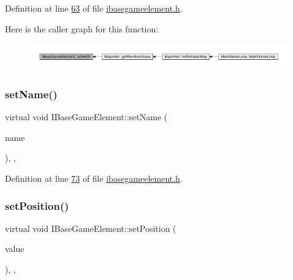 Definition at line \hyperlink{a00047_source_l00063}{63} of file \hyperlink{a00047_source}{ibasegameelement.\+h}.

Here is the caller graph for this function\+:
\nopagebreak
\begin{figure}[H]
\begin{center}
\leavevmode
\includegraphics[width=350pt]{d2/df5/a00137_a2f95e7a61b5db7f2fbbfd32ff786f58c_icgraph}
\end{center}
\end{figure}
\mbox{\label{a00137_a874f246d3249a989750e3db85ea4bfcd}} 
\subsubsection{\texorpdfstring{set\+Name()}{setName()}}
{\footnotesize\ttfamily virtual void I\+Base\+Game\+Element\+::set\+Name (\begin{DoxyParamCaption}\item[{Q\+String}]{name }\end{DoxyParamCaption})\hspace{0.3cm}{\ttfamily [inline]}, {\ttfamily [virtual]}, {\ttfamily [inherited]}}



Definition at line \hyperlink{a00047_source_l00073}{73} of file \hyperlink{a00047_source}{ibasegameelement.\+h}.

\mbox{\label{a00137_a54dc1a743fac99db03c3f47b5c6d69c4}} 
\subsubsection{\texorpdfstring{set\+Position()}{setPosition()}}
{\footnotesize\ttfamily virtual void I\+Base\+Game\+Element\+::set\+Position (\begin{DoxyParamCaption}\item[{Q\+Vector3D $\ast$}]{value }\end{DoxyParamCaption})\hspace{0.3cm}{\ttfamily [inline]}, {\ttfamily [virtual]}, {\ttfamily [inherited]}}




